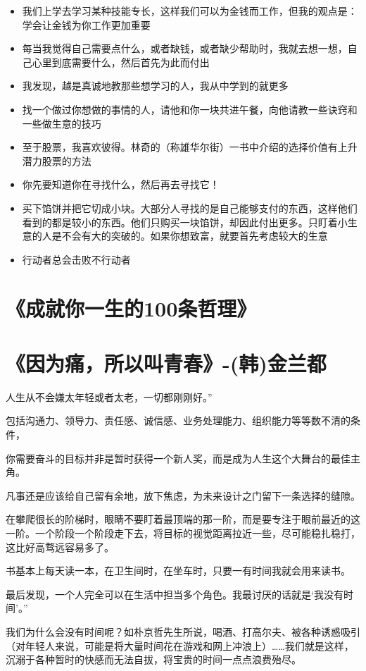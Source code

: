 \documentclass[UTF8,a4paper,8pt]{ctexart}
\begin{document}
\begin{itemize}
 	\item 我们上学去学习某种技能专长，这样我们可以为金钱而工作，但我的观点是：学会让金钱为你工作更加重要
 	\item 每当我觉得自己需要点什么，或者缺钱，或者缺少帮助时，我就去想一想，自己心里到底需要什么，然后首先为此而付出
 	\item 我发现，越是真诚地教那些想学习的人，我从中学到的就更多
 	\item 找一个做过你想做的事情的人，请他和你一块共进午餐，向他请教一些诀窍和一些做生意的技巧
 	\item 至于股票，我喜欢彼得。林奇的（称雄华尔街）一书中介绍的选择价值有上升潜力股票的方法
 	\item 你先要知道你在寻找什么，然后再去寻找它！
 	\item 买下馅饼并把它切成小块。大部分人寻找的是自己能够支付的东西，这样他们看到的都是较小的东西。他们只购买一块馅饼，却因此付出更多。只盯着小生意的人是不会有大的突破的。如果你想致富，就要首先考虑较大的生意
 	\item 行动者总会击败不行动者
 \end{itemize}
 
 \newpage
 \section{《成就你一生的100条哲理》 }
 
 \newpage
 \section{《因为痛，所以叫青春》-(韩)金兰都 }
 
 人生从不会嫌太年轻或者太老，一切都刚刚好。”
 
 
 包括沟通力、领导力、责任感、诚信感、业务处理能力、组织能力等等数不清的条件，
 
 
 你需要奋斗的目标并非是暂时获得一个新人奖，而是成为人生这个大舞台的最佳主角。
 
 
 凡事还是应该给自己留有余地，放下焦虑，为未来设计之门留下一条选择的缝隙。
 
 
 在攀爬很长的阶梯时，眼睛不要盯着最顶端的那一阶，而是要专注于眼前最近的这一阶。一个阶段一个阶段走下去，将目标的视觉距离拉近一些，尽可能稳扎稳打，这比好高骛远容易多了。
 
 
 书基本上每天读一本，在卫生间时，在坐车时，只要一有时间我就会用来读书。
 
 
 最后发现，一个人完全可以在生活中担当多个角色。我最讨厌的话就是‘我没有时间’。”
 
 
 我们为什么会没有时间呢？如朴京哲先生所说，喝酒、打高尔夫、被各种诱惑吸引（对年轻人来说，可能是将大量时间花在游戏和网上冲浪上）……我们就是这样，沉溺于各种暂时的快感而无法自拔，将宝贵的时间一点点浪费殆尽。
 
\end{document}
